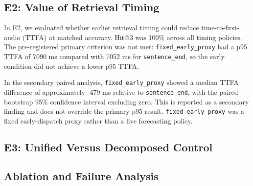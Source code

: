 \subsection{E2: Value of Retrieval Timing}
\label{subsec:e2_timing}
In E2, we evaluated whether earlier retrieval timing could reduce time-to-first-audio (TTFA) at matched accuracy. Hit@3 was 100\% across all timing policies. The pre-registered primary criterion was not met: \texttt{fixed\_early\_proxy} had a p95 TTFA of 7090 ms compared with 7052 ms for \texttt{sentence\_end}, so the early condition did not achieve a lower p95 TTFA.

In the secondary paired analysis, \texttt{fixed\_early\_proxy} showed a median TTFA difference of approximately -479 ms relative to \texttt{sentence\_end}, with the paired-bootstrap 95\% confidence interval excluding zero. This is reported as a secondary finding and does not override the primary p95 result. \texttt{fixed\_early\_proxy} was a fixed early-dispatch proxy rather than a live forecasting policy.
\subsection{E3: Unified Versus Decomposed Control}
\label{subsec:e3_unified_vs_decomposed}

\subsection{Ablation and Failure Analysis}
\label{subsec:ablation_failure}
